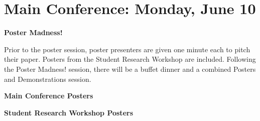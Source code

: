 \chapter{Main Conference: Monday, June 10}
\thispagestyle{emptyheader}

\newpage
\newpage


\newpage



\vspace{1em}\par\centerline{\bfseries\Large Poster Madness!}\vspace{1em}\par
{}

Prior to the poster session, poster presenters are given one minute each to pitch their
paper. Posters from the Student Research Workshop are included. Following the Poster Madness!
session, there will be a buffet dinner and a combined Posters and Demonstrations session.

\noindent
\vspace{1em}\par\centerline{\bfseries\large Main Conference Posters}\vspace{1em}\par


\noindent
\vspace{1em}\par\centerline{\bfseries\large Student Research Workshop Posters}\vspace{1em}\par
\noindent


